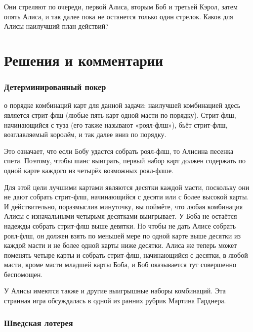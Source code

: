 \documentclass[twoside]{book}
\begin{document}
Они стреляют по очереди, первой Алиса, вторым Боб и третьей Кэрол, затем опять Алиса, и так далее пока не останется только один стрелок.
Каков для Алисы наилучший план действий?



\section*{Решения и комментарии}

\subsubsection*{Детерминированный покер}%


 о порядке комбинаций карт для данной задачи:  наилучшей комбинацией здесь является стрит-флш (любые пять карт одной масти по порядку).
Стрит-флш, начинающийся с туза (его также называют «роял-флш»), бьёт стрит-флш, возглавляемый королём, и так далее вниз по порядку.

Это означает, что если Бобу удастся собрать роял-флш, то Алисина песенка спета.
Поэтому, чтобы  шанс выиграть,  первый набор карт должен содержать по одной карте каждого из четырёх возможных роял-флше.

Для этой цели лучшими картами являются десятки каждой масти, поскольку они не дают собрать стрит-флш, начинающийся с десяти или с более высокой карты.
И действительно, поразмыслив минуточку, вы поймёте, что любая комбинация Алисы с изначальными четырьмя десятками выигрывает.
У Боба не остаётся надежды собрать стрит-флш выше девятки.
Но чтобы не дать Алисе собрать роял-флш, он должен взять по меньшей мере по одной карте выше десятки из каждой масти и не более одной карты ниже десятки.
Алиса же теперь может поменять четыре карты и собрать стрит-флш, начинающийся с десятки, в любой масти, кроме масти младшей карты Боба,
и Боб оказывается тут совершенно беспомощен.
\heart

У Алисы имеются также и другие выигрышные наборы комбинаций.
Эта странная игра обсуждалась в одной из ранних рубрик Мартина Гарднера. 

\subsubsection*{Шведская лотерея}%
\end{document}

